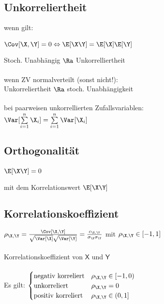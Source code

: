 \documentclass[german,color,6pt]{latex4ei/latex4ei_sheet}
\begin{document}
\begin{sectionbox}
	\subsection{Unkorreliertheit}
	wenn gilt:
	\begin{emphbox}
		$\Cov [\X,\Y] = 0 \Leftrightarrow \E[\X\Y] = \E[\X] \E[\Y]$
	\end{emphbox}
	Stoch. Unabhängig $\Ra$ Unkorrelliertheit \\\\
	wenn ZV normalverteilt (sonst nicht!):\\
	Unkorreliertheit $\Ra$ stoch. Unabhängigkeit\\\\
	bei paarweisen unkorrellierten Zufallsvariablen:\\
	$\Var[\sum \limits_{i=1}^{n} \X_i] = \sum \limits_{i=1}^{n} \Var [\X_i]$
\end{sectionbox}

\begin{sectionbox}
	\subsection{Orthogonalität}

	\begin{emphbox}
		$\E[\X\Y] = 0$
	\end{emphbox}
	mit dem Korrelationswert $\E[\X\Y]$

\end{sectionbox}

\begin{sectionbox}
	\subsection{Korrelationskoeffizient}
	$\rho_{\X,\Y} = \frac{\Cov[\X,\Y]}{\sqrt{\Var[\X]} \sqrt{\Var[\Y]}} = \frac{c_{\X,\Y}}{\sigma_{\X} \sigma_{\Y}}$ mit $\rho_{\X, \Y} \in [-1,1]$\\ \\
	Korrelationskoeffizient von $\mathsf X$ und $\mathsf Y$\\\\
	Es gilt: $\begin{cases}\text{negativ korreliert} & \rho_{\mathsf{\X,\Y}}\in [-1,0) \\
	\text{unkorreliert} & \rho_{\mathsf{\X,\Y}}=0 \\
	\text{positiv korreliert} & \rho_{\mathsf{\X,\Y}}\in (0,1]\end{cases}$
\end{sectionbox}
\end{document}
